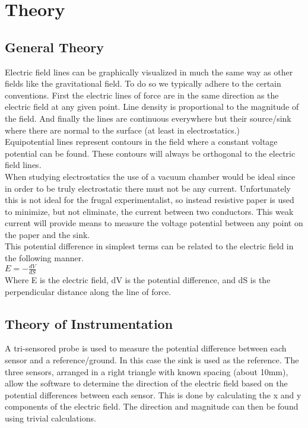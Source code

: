 \documentclass{article}
\begin{document}
\section{Theory}
\subsection{General Theory}
Electric field lines can be graphically visualized in much the same way as other fields like the gravitational field. To do so we typically adhere to the certain conventions. First the electric lines of force are in the same direction as the electric field at any given point. Line density is proportional to the magnitude of the field. And finally the lines are continuous everywhere but their source/sink where there are normal to the surface (at least in electrostatics.)\\

Equipotential lines represent contours in the field where a constant voltage potential can be found. These contours will always be orthogonal to the electric field lines.\\

When studying electrostatics the use of a vacuum chamber would be ideal since in order to be truly electrostatic there must not be any current. Unfortunately this is not ideal for the frugal experimentalist, so instead resistive paper is used to minimize, but not eliminate, the current between two conductors. This weak current will provide means to measure the voltage potential between any point on the paper and the sink.\\

This potential difference in simplest terms can be related to the electric field in the following manner.\\

$E=-\frac{dV}{dS}$\\

Where E is the electric field, dV is the potential difference, and dS is the perpendicular distance along the line of force.

\subsection{Theory of Instrumentation}
A tri-sensored probe is used to measure the potential difference between each sensor and a reference/ground. In this case the sink is used as the reference. The three sensors, arranged in a right triangle with known spacing (about 10mm), allow the software to determine the direction of the electric field based on the potential differences between each sensor. This is done by calculating the x and y components of the electric field. The direction and magnitude can then be found using trivial calculations.
\end{document}

